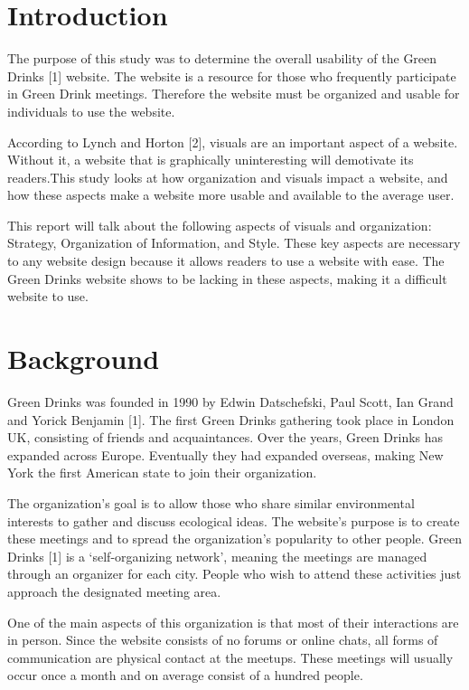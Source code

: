 \documentclass[12pt]{article}
\begin{document}
\section{Introduction}
The purpose of this study was to determine the overall usability of the Green Drinks [1] website. The website is a resource for those who frequently participate in Green Drink meetings. Therefore the website must be organized and usable for individuals to use the website.

According to Lynch and Horton [2], visuals are an important aspect of a website. Without it, a website that is graphically uninteresting will demotivate its readers.This study looks at how organization and visuals impact a website, and how these aspects make a website more usable and available to the average user.

This report will talk about the following aspects of visuals and organization: Strategy, Organization of Information, and Style. These key aspects are necessary to any website design because it allows readers to use a website with ease. The Green Drinks website shows to be lacking in these aspects, making it a difficult website to use.
\section{Background}
Green Drinks was founded in 1990 by Edwin Datschefski, Paul Scott, Ian Grand and Yorick Benjamin [1]. The first Green Drinks gathering took place in London UK, consisting of friends and acquaintances. Over the years, Green Drinks has expanded across Europe. Eventually they had expanded overseas, making New York the first American state to join their organization. 

The organization’s goal is to allow those who share similar environmental interests to gather and discuss ecological ideas. The website’s purpose is to create these meetings and to spread the organization’s popularity to other people. Green Drinks [1] is a ‘self-organizing network’, meaning the meetings are managed through an organizer for each city. People who wish to attend these activities just approach the designated meeting area. 

One of the main aspects of this organization is that most of their interactions are in person. Since the website consists of no forums or online chats, all forms of communication are physical contact at the meetups. These meetings will usually occur once a month and on average consist of a hundred people.
\end{document}
